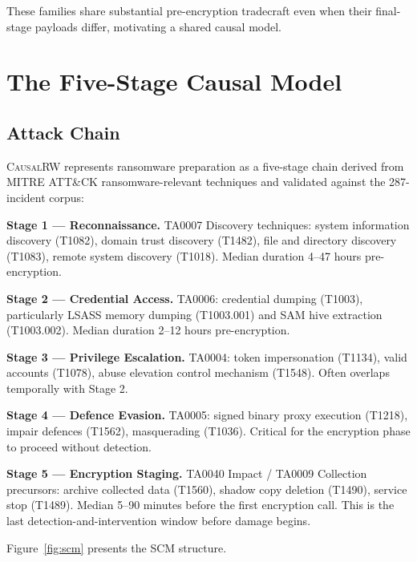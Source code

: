 \documentclass[sigconf,nonacm]{acmart}
\begin{document}
These families share substantial pre-encryption tradecraft even when
their final-stage payloads differ, motivating a shared causal model.

\section{The Five-Stage Causal Model}

\subsection{Attack Chain}

\textsc{CausalRW} represents ransomware preparation as a five-stage
chain derived from MITRE ATT\&CK ransomware-relevant techniques and
validated against the 287-incident corpus:

\textbf{Stage 1 --- Reconnaissance.} TA0007 Discovery techniques: system
information discovery (T1082), domain trust discovery (T1482), file and
directory discovery (T1083), remote system discovery (T1018). Median
duration 4--47 hours pre-encryption.

\textbf{Stage 2 --- Credential Access.} TA0006: credential dumping
(T1003), particularly LSASS memory dumping (T1003.001) and SAM hive
extraction (T1003.002). Median duration 2--12 hours pre-encryption.

\textbf{Stage 3 --- Privilege Escalation.} TA0004: token impersonation
(T1134), valid accounts (T1078), abuse elevation control mechanism
(T1548). Often overlaps temporally with Stage 2.

\textbf{Stage 4 --- Defence Evasion.} TA0005: signed binary proxy
execution (T1218), impair defences (T1562), masquerading (T1036).
Critical for the encryption phase to proceed without detection.

\textbf{Stage 5 --- Encryption Staging.} TA0040 Impact / TA0009
Collection precursors: archive collected data (T1560), shadow copy
deletion (T1490), service stop (T1489). Median 5--90 minutes before
the first encryption call. This is the last detection-and-intervention
window before damage begins.

Figure~\ref{fig:scm} presents the SCM structure.
\end{document}
